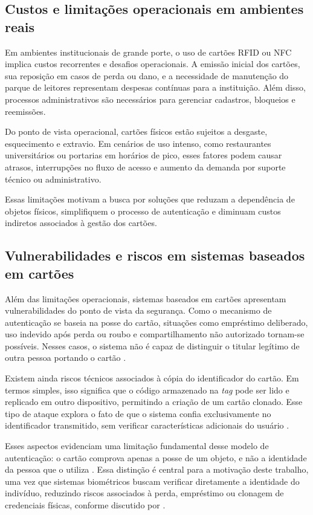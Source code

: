 \subsection{Custos e limitações operacionais em ambientes reais}

Em ambientes institucionais de grande porte, o uso de cartões \acs{RFID} ou \acs{NFC} implica custos recorrentes e desafios operacionais. A emissão inicial dos cartões, sua reposição em casos de perda ou dano, e a necessidade de manutenção do parque de leitores representam despesas contínuas para a instituição. Além disso, processos administrativos são necessários para gerenciar cadastros, bloqueios e reemissões.

Do ponto de vista operacional, cartões físicos estão sujeitos a desgaste, esquecimento e extravio. Em cenários de uso intenso, como restaurantes universitários ou portarias em horários de pico, esses fatores podem causar atrasos, interrupções no fluxo de acesso e aumento da demanda por suporte técnico ou administrativo.

Essas limitações motivam a busca por soluções que reduzam a dependência de objetos físicos, simplifiquem o processo de autenticação e diminuam custos indiretos associados à gestão dos cartões.

\subsection{Vulnerabilidades e riscos em sistemas baseados em cartões}

Além das limitações operacionais, sistemas baseados em cartões apresentam vulnerabilidades do ponto de vista da segurança. Como o mecanismo de autenticação se baseia na posse do cartão, situações como empréstimo deliberado, uso indevido após perda ou roubo e compartilhamento não autorizado tornam-se possíveis. Nesses casos, o sistema não é capaz de distinguir o titular legítimo de outra pessoa portando o cartão \cite{masyuk2019rfid}.

Existem ainda riscos técnicos associados à cópia do identificador do cartão. Em termos simples, isso significa que o código armazenado na \textit{tag} pode ser lido e replicado em outro dispositivo, permitindo a criação de um cartão clonado. Esse tipo de ataque explora o fato de que o sistema confia exclusivamente no identificador transmitido, sem verificar características adicionais do usuário \cite{masyuk2019rfid}.

Esses aspectos evidenciam uma limitação fundamental desse modelo de autenticação: o cartão comprova apenas a posse de um objeto, e não a identidade da pessoa que o utiliza \cite{masyuk2019rfid}. Essa distinção é central para a motivação deste trabalho, uma vez que sistemas biométricos buscam verificar diretamente a identidade do indivíduo, reduzindo riscos associados à perda, empréstimo ou clonagem de credenciais físicas, conforme discutido por \textcite{parmar2013face}.

